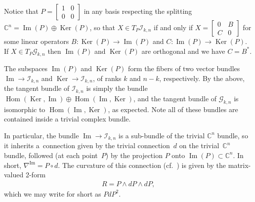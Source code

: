 \documentclass[10pt,a4paper]{amsart}
\numberwithin{equation}{section}
\newcommand{\CC}{\mathbb{C}}
\newcommand{\cG}{{\mathcal G}}
\newcommand{\cI}{{\mathcal I}}
\begin{document}
Notice that $P =\left[\begin{smallmatrix}
1 & 0 \\
0 & 0
\end{smallmatrix}\right]$ in any basis respecting the splitting $\CC^n = \operatorname{Im}(P) \oplus \operatorname{Ker}(P)$, so that $X \in T_P \cI_{k,n}$ if and only if
$X =\left[\begin{smallmatrix}
0 & B \\
C & 0
\end{smallmatrix}\right]$ for some linear operators $B\colon \operatorname{Ker}(P) \to \operatorname{Im}(P)$ and $C \colon \operatorname{Im}(P) \to \operatorname{Ker}(P)$. If $X \in T_P \cG_{k,n}$ then $\operatorname{Im}(P)$ and $\operatorname{Ker}(P)$ are orthogonal and we have $C = B^*$.

The subspaces $\operatorname{Im}(P)$ and $\operatorname{Ker}(P)$ form the fibers of two vector bundles $\operatorname{Im} \to \cI_{k,n}$ and
$\operatorname{Ker} \to \cI_{k,n}$, of ranks $k$ and $n-k$, respectively. By the above, the tangent bundle of $\cI_{k,n}$ is simply the bundle $\operatorname{Hom}( \operatorname{Ker}, \operatorname{Im}) \oplus \operatorname{Hom}( \operatorname{Im}, \operatorname{Ker})$, and the tangent bundle of $\cG_{k,n}$ is isomorphic to $\operatorname{Hom}(\operatorname{Im},\operatorname{Ker})$, as expected. Note all of these bundles are contained inside a trivial complex bundle.

In particular, the bundle $\operatorname{Im} \to \cI_{k,n}$ is a sub-bundle of the trivial $\CC^n$ bundle, so it inherits a~connection given by
the trivial connection~$d$ on the trivial~$\CC^n$ bundle, followed (at each point~$P$) by the projection $P$ onto $\operatorname{Im}(P) \subset \CC^n$. In short, $\nabla^{\operatorname{Im}} = P \circ d$. The curvature of this connection (cf.~\cite[p.~344]{K}) is given by the matrix-valued 2-form
\begin{gather*}
R = P \wedge dP \wedge dP,
\end{gather*}
which we may write for short as $PdP^2$.
\end{document}
